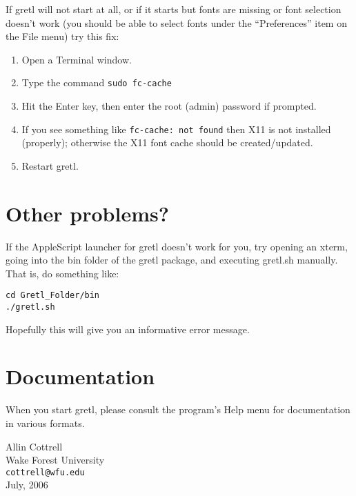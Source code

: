 \documentclass[11pt]{article}
\begin{document}
If gretl will not start at all, or if it starts but fonts are missing
or font selection doesn't work (you should be able to select fonts
under the ``Preferences'' item on the File menu) try this fix:

\begin{enumerate}
\item Open a Terminal window.
\item Type the command \texttt{sudo fc-cache}
\item Hit the Enter key, then enter the root (admin) password if
  prompted.
\item If you see something like \texttt{fc-cache: not found} then
   X11 is not installed (properly); otherwise the X11 font cache
   should be created/updated.
\item Restart gretl.
\end{enumerate}

\section{Other problems?}

If the AppleScript launcher for gretl doesn't work for you, try
opening an xterm, going into the \textsf{bin} folder of the
gretl package, and executing \textsf{gretl.sh} manually.  That is, do
something like:

\begin{verbatim}
cd Gretl_Folder/bin
./gretl.sh
\end{verbatim}

Hopefully this will give you an informative error message.

\section{Documentation}
\label{sec:doc}

When you start gretl, please consult the program's Help menu for
documentation in various formats.

\vspace{.25in}

\raggedright
Allin Cottrell \\
Wake Forest University \\
\texttt{cottrell@wfu.edu} \\
July, 2006
\end{document}
